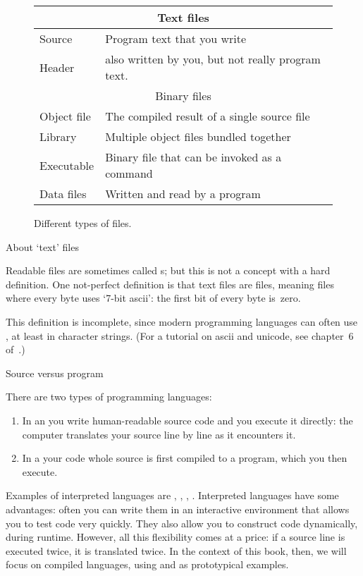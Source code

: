 \begin{figure}[ht]
  \begin{tabular}{ll}
    \toprule
    \multicolumn{2}{c}{Text files}\\
    \midrule
    Source&Program text that you write\\
    Header&also written by you, but not really program text.\\
    \midrule
    \multicolumn{2}{c}{Binary files}\\
    \midrule
    Object file&The compiled result of a single source file\\
    Library&Multiple object files bundled together\\
    Executable&Binary file that can be invoked as a command\\
    Data files&Written and read by a program\\
    \midrule
  \end{tabular}
  \caption{Different types of files.}
  \label{fig:file-types}
\end{figure}

 {About `text' files}

Readable files are sometimes called s;
but this is not a concept with a hard definition.
One not-perfect definition is that text files are  files,
meaning files where every byte uses `7-bit ascii': the first bit of every
byte is~zero.

This definition is incomplete, since modern programming languages
can often use , at least in character strings.
(For a tutorial on ascii and unicode, see chapter~6
of~\cite{Eijkhout:TeXscience}.)

 {Source versus program}

There are two types of programming languages:
\begin{enumerate}
\item In an  you write
  human-readable source code and you execute it directly: the computer
  translates your source line by line as it encounters it. 
\item In a  your code whole source
  is first compiled to a program, which you then execute.
\end{enumerate}
Examples of interpreted languages are ,
, , .
Interpreted languages have some advantages: often you can write them
in an interactive environment that allows you to test code very
quickly. They also allow you to construct code dynamically, during
runtime. However, all this flexibility comes at a price: if a source
line is executed twice, it is translated twice. In the context of this
book, then, we will focus on compiled languages, using 
and  as prototypical examples.

